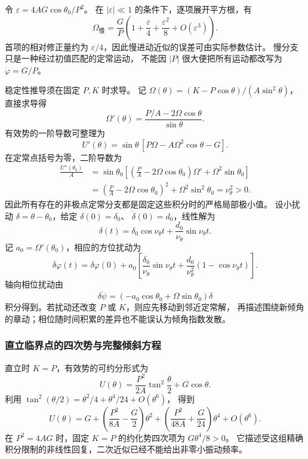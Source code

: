 \documentclass[UTF8,zihao=-4,fontset=fandol,a4paper]{ctexart}
\begin{document}
令 $\varepsilon=4AG\cos\theta_0/P^2$。
在 $|\varepsilon|\ll1$ 的条件下，逐项展开平方根，有
\[
\Omega_{\text{慢}}=\frac GP
\left(1+\frac\varepsilon4+\frac{\varepsilon^2}{8}
+O(\varepsilon^3)\right).
\]
首项的相对修正量约为 $\varepsilon/4$，因此慢进动近似的误差可由实际参数估计。
慢分支只是一种经过初值匹配的定常运动，
不能因 $|P|$ 很大便把所有运动都改写为 $\dot\varphi=G/P$。

稳定性推导须在固定 $P,K$ 时求导。
记 $\Omega(\theta)=(K-P\cos\theta)/(A\sin^2\theta)$，直接求导得
\[
\Omega'(\theta)=\frac{P/A-2\Omega\cos\theta}{\sin\theta}.
\]
有效势的一阶导数可整理为
\[
U'(\theta)=\sin\theta\,[P\Omega-A\Omega^2\cos\theta-G].
\]
在定常点括号为零，二阶导数为
\[
\begin{aligned}
\frac{U''(\theta_0)}A
&=\sin\theta_0\left[
\left(\frac PA-2\Omega\cos\theta_0\right)\Omega'
+\Omega^2\sin\theta_0\right]\\
&=\left(\frac PA-2\Omega\cos\theta_0\right)^2
+\Omega^2\sin^2\theta_0=\nu_\theta^2>0.
\end{aligned}
\]
因此所有存在的非极点定常分支都是固定这些积分时的严格局部极小值。
设小扰动 $\delta=\theta-\theta_0$，给定 $\delta(0)=\delta_0$、
$\dot\delta(0)=d_0$，线性解为
\[
\delta(t)=\delta_0\cos\nu_\theta t+
\frac{d_0}{\nu_\theta}\sin\nu_\theta t.
\]
记 $a_0=\Omega'(\theta_0)$，相应的方位扰动为
\[
\delta\varphi(t)=\delta\varphi(0)+a_0
\left[\frac{\delta_0}{\nu_\theta}\sin\nu_\theta t
+\frac{d_0}{\nu_\theta^2}(1-\cos\nu_\theta t)\right].
\]
轴向相位扰动由
\[
\delta\dot\psi=(-a_0\cos\theta_0+\Omega\sin\theta_0)\delta
\]
积分得到。若扰动还改变 $P$ 或 $K$，则应先移动到邻近定常解，
再描述围绕新倾角的章动；相位随时间积累的差异也不能误认为倾角指数发散。

\subsubsection*{直立临界点的四次势与完整倾斜方程}
直立时 $K=P$，有效势的可约分形式为
\[
U(\theta)=\frac{P^2}{2A}\tan^2\frac\theta2+G\cos\theta.
\]
利用 $\tan^2(\theta/2)=\theta^2/4+\theta^4/24+O(\theta^6)$，
得到
\[
U(\theta)=G+\left(\frac{P^2}{8A}-\frac G2\right)\theta^2
+\left(\frac{P^2}{48A}+\frac G{24}\right)\theta^4+O(\theta^6).
\]
在 $P^2=4AG$ 时，固定 $K=P$ 的约化势四次项为 $G\theta^4/8>0$。
它描述受这组精确积分限制的非线性回复，二次近似已经不能给出非零小振动频率。
\end{document}
